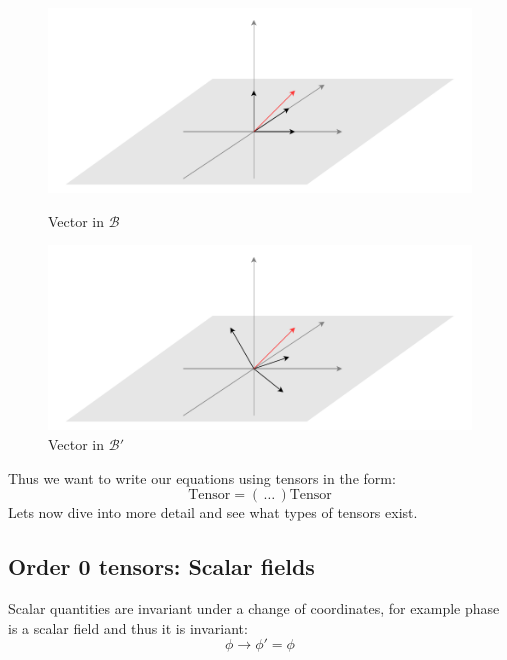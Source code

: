 \begin{figure}[H]
    \begin{minipage}{0.5\textwidth}
     \centering
     \includegraphics[width=1\linewidth]{res/svg/vector.drawio}
     \caption{Vector in $\mathcal{B}$}
   \end{minipage}\hfill
   \begin{minipage}{0.5\textwidth}
     \centering
     \includegraphics[width=1\linewidth]{res/svg/vettore_new.drawio}
     \caption{Vector in $\mathcal{B}'$}
   \end{minipage}
\end{figure}
Thus we want to write our equations using tensors in the form:
\begin{equation}
  \text{Tensor} = ( \,\dots\, )\text{Tensor}
\end{equation}
Lets now dive into more detail and see what types of tensors exist.
\subsection{Order 0 tensors: Scalar fields}
Scalar quantities are invariant under a change of coordinates, for example phase is a scalar field and thus it is invariant:
\begin{equation}
  \phi \longrightarrow \phi' = \phi
\end{equation}
